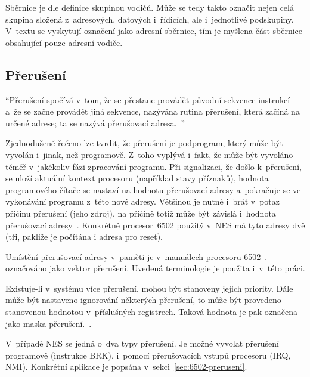 \begin{note}
	Sběrnice je dle definice skupinou vodičů. Může se tedy takto označit nejen celá skupina složená z~adresových, datových i~řídicích, ale i~jednotlivé podskupiny. V~textu se vyskytují označení jako adresní sběrnice, tím je myšlena část sběrnice obsahující pouze adresní vodiče.
\end{note}

\subsection{Přerušení}
\begin{definition} [Přerušení]
	\enquote{Přerušení spočívá v~tom, že se přestane provádět původní sekvence instrukcí a~že se začne provádět jiná sekvence, nazývána rutina přerušení, která začíná na určené adrese; ta se nazývá přerušovací adresa.~\cite{Pluhacek1995:plp}}
\end{definition}

Zjednodušeně řečeno lze tvrdit, že přerušení je podprogram, který může být vyvolán i~jinak, než programově. Z~toho vyplývá i~fakt, že může být vyvoláno téměř v~jakékoliv fázi zpracování programu.  Při signalizaci, že došlo k~přerušení, se uloží aktuální kontext procesoru (například stavy příznaků), hodnota programového čítače se nastaví na hodnotu přerušovací adresy a~pokračuje se ve vykonávání programu z~této nové adresy. Většinou je nutné i~brát v~potaz příčinu přerušení (jeho zdroj), na příčině totiž může být závislá i~hodnota přerušovací adresy~\cite{Pluhacek1995:plp}. Konkrétně procesor~6502 použitý v~NES má tyto adresy dvě (tři, pakliže je počítána i adresa pro reset).

\begin{note}
	Umístění přerušovací adresy v~paměti je v~manuálech procesoru 6502~\cite{mos:hw-manual}. označováno jako vektor přerušení. Uvedená terminologie je použita i~v~této práci.
\end{note}

Existuje-li v~systému více přerušení, mohou být stanoveny jejich priority. Dále může být nastaveno ignorování některých přerušení, to může být provedeno stanovenou hodnotou v~příslušných registrech. Taková hodnota je pak označena jako maska přerušení.~\cite{Pluhacek1995:plp}.

V~případě NES se jedná o~dva typy přerušení. Je možné vyvolat přerušení programově (instrukce BRK), i~pomocí přerušovacích vstupů procesoru (IRQ, NMI). Konkrétní aplikace je popsána v~sekci~\ref{sec:6502-preruseni}.

